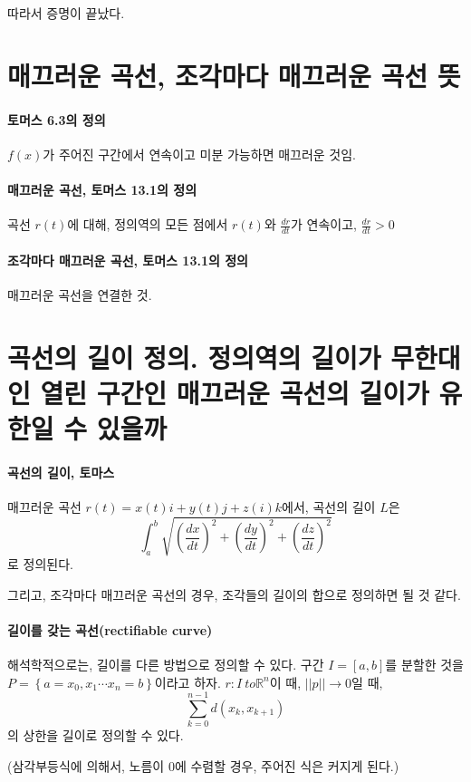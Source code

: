 따라서 증명이 끝났다.

\section{매끄러운 곡선, 조각마다 매끄러운 곡선 뜻}
\paragraph{토머스 6.3의 정의} $f(x)$가 주어진 구간에서 연속이고 미분 가능하면 매끄러운 것임.

\paragraph{매끄러운 곡선, 토머스 13.1의 정의} 곡선 $r(t)$에 대해, 정의역의 모든 점에서 $r(t)$와 $\frac{dr}{dt}$가 연속이고, $\frac{dr}{dt}>0$
\paragraph{조각마다 매끄러운 곡선, 토머스 13.1의 정의} 매끄러운 곡선을 연결한 것.

\section{곡선의 길이 정의. 정의역의 길이가 무한대인 열린 구간인 매끄러운 곡선의 길이가 유한일 수 있을까}
\paragraph{곡선의 길이, 토마스} 매끄러운 곡선 $r(t) = x(t)i+y(t)j + z(i)k$에서, 곡선의 길이 $L$은  
$$\int_a^b \sqrt{ \left( \frac{dx}{dt} \right)^2 + \left( \frac{dy}{dt} \right)^2 + \left( \frac{dz}{dt} \right)^2 }$$
로 정의된다.

그리고, 조각마다 매끄러운 곡선의 경우, 조각들의 길이의 합으로 정의하면 될 것 같다.

\paragraph{길이를 갖는 곡선(rectifiable curve)}
해석학적으로는, 길이를 다른 방법으로 정의할 수 있다. 
구간 $I = \left[a,b\right]$를 분할한 것을 $P = \left\{ a=x_0, x_1 \cdots x_n=b \right\}$이라고 하자. $r : I \
to \mathbb{R}^n$이 때,
$||p|| \to 0$일 때, $$\sum_{k=0}^{n-1} d(x_k, x_{k+1})$$의 상한을 길이로 정의할 수 있다. 

(삼각부등식에 의해서, 노름이 0에 수렴할 경우, 주어진 식은 커지게 된다.)

